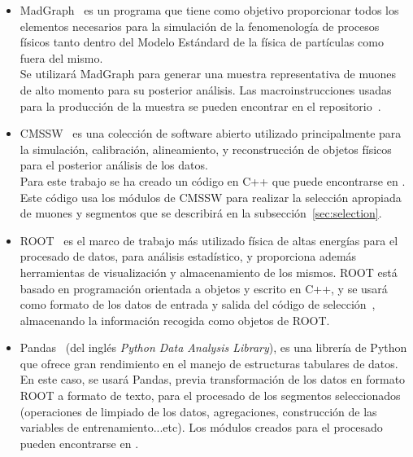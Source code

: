 \begin{itemize}

\item MadGraph~\cite{Alwall:2014hca} es un programa que tiene como objetivo proporcionar todos los elementos necesarios para la simulaci\'on de la fenomenolog\'ia de procesos f\'isicos tanto dentro del Modelo Est\'andard de la f\'isica de part\'iculas como fuera del mismo. \\
Se utilizar\'a MadGraph para generar una muestra representativa de muones de alto momento para su posterior an\'alisis. Las macroinstrucciones usadas para la producci\'on de la muestra se pueden encontrar en el repositorio~\cite{generator}.

\item CMSSW~\cite{cmssw} es una colecci\'on de software abierto utilizado principalmente para la simulaci\'on, calibraci\'on, alineamiento, y reconstrucci\'on de objetos f\'isicos para el posterior an\'alisis de los datos. \\
Para este trabajo se ha creado un c\'odigo en C++ que puede encontrarse en \cite{analyzer}. Este c\'odigo usa los m\'odulos de CMSSW para realizar la selecci\'on apropiada de muones y segmentos que se describir\'a en la subsecci\'on~\ref{sec:selection}. 

\item ROOT~\cite{root} es el marco de trabajo m\'as utilizado f\'isica de altas energ\'ias para el procesado de datos, para an\'alisis estad\'istico, y proporciona adem\'as herramientas de visualizaci\'on y almacenamiento de los mismos. ROOT est\'a basado en programaci\'on orientada a objetos y escrito en C++, y se usar\'a como formato de los datos de entrada y salida del c\'odigo de selecci\'on~\cite{analyzer}, almacenando la informaci\'on recogida como objetos de ROOT.

\item Pandas~\cite{mckinney-proc-scipy-2010} (del ingl\'es \textit{Python Data Analysis Library}), es una librer\'ia de Python que ofrece gran rendimiento en el manejo de estructuras tabulares de datos. \\
En este caso, se usar\'a Pandas, previa transformaci\'on de los datos en formato ROOT a formato de texto, para el procesado de los segmentos seleccionados (operaciones de limpiado de los datos, agregaciones, construcci\'on de las variables de entrenamiento...etc). Los m\'odulos creados para el procesado pueden encontrarse en \cite{processor}.

\end{itemize}


